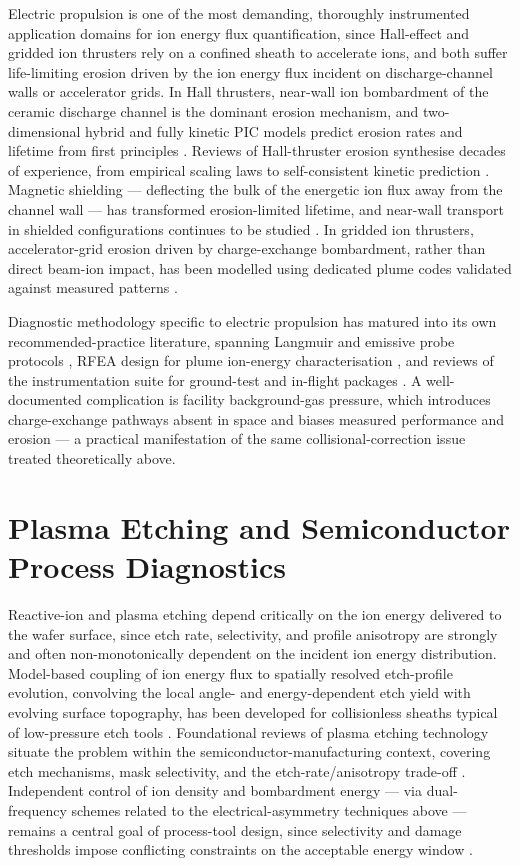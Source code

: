 Electric propulsion is one of the most demanding, thoroughly instrumented application domains for ion energy flux quantification, since Hall-effect and gridded ion thrusters rely on a confined sheath to accelerate ions, and both suffer life-limiting erosion driven by the ion energy flux incident on discharge-channel walls or accelerator grids. In Hall thrusters, near-wall ion bombardment of the ceramic discharge channel is the dominant erosion mechanism, and two-dimensional hybrid and fully kinetic PIC models predict erosion rates and lifetime from first principles \cite{ref0433}. Reviews of Hall-thruster erosion synthesise decades of experience, from empirical scaling laws to self-consistent kinetic prediction \cite{ref0440}. Magnetic shielding — deflecting the bulk of the energetic ion flux away from the channel wall — has transformed erosion-limited lifetime, and near-wall transport in shielded configurations continues to be studied \cite{ref0425}. In gridded ion thrusters, accelerator-grid erosion driven by charge-exchange bombardment, rather than direct beam-ion impact, has been modelled using dedicated plume codes validated against measured patterns \cite{ref0463}.

Diagnostic methodology specific to electric propulsion has matured into its own recommended-practice literature, spanning Langmuir and emissive probe protocols \cite{ref0226}, RFEA design for plume ion-energy characterisation \cite{ref0490}, and reviews of the instrumentation suite for ground-test and in-flight packages \cite{ref0506}. A well-documented complication is facility background-gas pressure, which introduces charge-exchange pathways absent in space and biases measured performance and erosion \cite{ref0461} — a practical manifestation of the same collisional-correction issue treated theoretically above.

\section{Plasma Etching and Semiconductor Process Diagnostics}

Reactive-ion and plasma etching depend critically on the ion energy delivered to the wafer surface, since etch rate, selectivity, and profile anisotropy are strongly and often non-monotonically dependent on the incident ion energy distribution. Model-based coupling of ion energy flux to spatially resolved etch-profile evolution, convolving the local angle- and energy-dependent etch yield with evolving surface topography, has been developed for collisionless sheaths typical of low-pressure etch tools \cite{ref0074}. Foundational reviews of plasma etching technology situate the problem within the semiconductor-manufacturing context, covering etch mechanisms, mask selectivity, and the etch-rate/anisotropy trade-off \cite{ref0536}. Independent control of ion density and bombardment energy — via dual-frequency schemes related to the electrical-asymmetry techniques above — remains a central goal of process-tool design, since selectivity and damage thresholds impose conflicting constraints on the acceptable energy window \cite{ref0539}.

